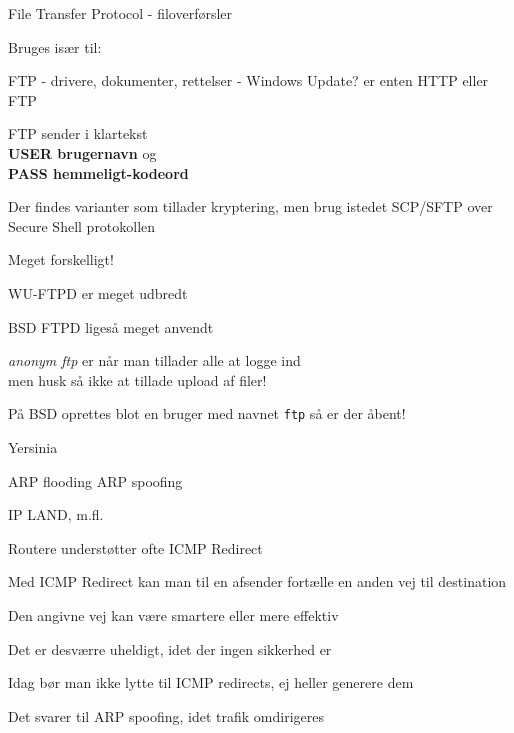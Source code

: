 \documentclass[Screen16to9,17pt]{foils}
\begin{document}

\begin{list1}
\item File Transfer Protocol - filoverførsler
\item Bruges især til:
  \begin{list2}
    \item FTP - drivere, dokumenter, rettelser - Windows Update? er
    enten HTTP eller FTP
  \end{list2}
\item FTP sender i klartekst\\
{\bfseries USER brugernavn} og \\
{\bfseries PASS hemmeligt-kodeord}
\item Der findes varianter som tillader kryptering, men brug istedet SCP/SFTP over Secure Shell protokollen
\end{list1}



\begin{list1}
\item Meget forskelligt!
\item WU-FTPD er meget udbredt
\item BSD FTPD ligeså meget anvendt
\item \emph{anonym ftp} er når man tillader alle at logge ind\\
men husk så ikke at tillade upload af filer!
\item På BSD oprettes blot en bruger med navnet \verb+ftp+ så er der åbent!
\end{list1}



Yersinia

ARP flooding
ARP spoofing

IP
LAND, m.fl.



\begin{list1}
\item Routere understøtter ofte ICMP Redirect
\item Med ICMP Redirect kan man til en afsender fortælle en anden vej til destination
\item Den angivne vej kan være smartere eller mere effektiv
\item Det er desværre uheldigt, idet der ingen sikkerhed er
\item Idag bør man ikke lytte til ICMP redirects, ej heller generere dem
\item Det svarer til ARP spoofing, idet trafik omdirigeres
\end{list1}
\end{document}
